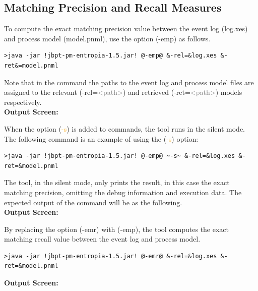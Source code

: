 \documentclass{article}
\begin{document}
\subsection{Matching Precision and Recall Measures}
To compute the exact matching precision value between the event log (log.xes) and process model  (model.pnml), use the option (\textcolor{darkcandyapplered}{\footnotesize\ttfamily-emp}) as follows.
\begin{lstlisting}[style=CL]
>java -jar !jbpt-pm-entropia-1.5.jar! @-emp@ &-rel=&log.xes &-ret&=model.pnml
\end{lstlisting}
Note that in the command the paths to the event log and process model files are assigned to the relevant (\textcolor{ao}{\footnotesize\ttfamily-rel=}\textcolor{gray}{\footnotesize\ttfamily<path>}) and retrieved (\textcolor{ao}{\footnotesize\ttfamily-ret=}\textcolor{gray}{\footnotesize\ttfamily<path>}) models respectively.\\

\textbf{Output Screen:}%


When the option (\textcolor{orange}{\footnotesize\ttfamily-s}) is added to commands, the tool runs in the silent mode. The following command is an example of using the (\textcolor{orange}{\footnotesize\ttfamily-s}) option:
\begin{lstlisting}[style=CL]
>java -jar !jbpt-pm-entropia-1.5.jar! @-emp@ ~-s~ &-rel=&log.xes &-ret=&model.pnml
\end{lstlisting}
The tool, in the silent mode, only prints the result, in this case the exact matching precision, omitting the debug information and execution data. The expected output of the command will be as the following. \\
\textbf{Output Screen:}%


By replacing the option (\textcolor{darkcandyapplered}{\footnotesize\ttfamily-emr}) with (\textcolor{darkcandyapplered}{\footnotesize\ttfamily-emp}), the tool computes the exact matching recall value between the event log and process model. 

\begin{lstlisting}[style=CL]
>java -jar !jbpt-pm-entropia-1.5.jar! @-emr@ &-rel=&log.xes &-ret=&model.pnml
\end{lstlisting}
\textbf{Output Screen:}%

\end{document}
